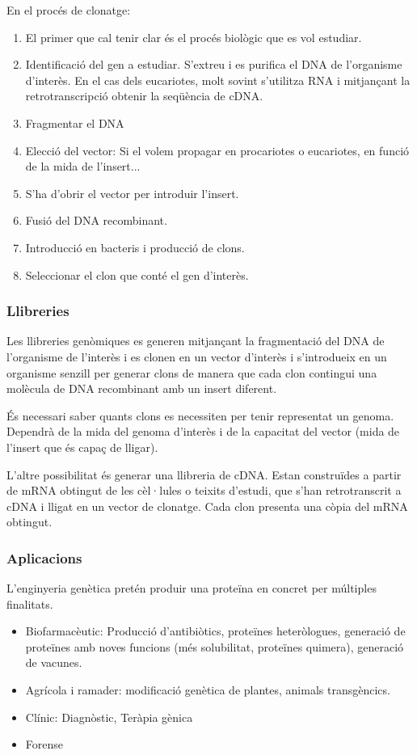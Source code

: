 En el procés de clonatge:
\begin{enumerate}
\item El primer que cal tenir clar és el procés biològic que es vol estudiar.
\item Identificació del gen a estudiar. S'extreu i es purifica el DNA de l'organisme d'interès. En el cas dels eucariotes, molt sovint s'utilitza RNA i mitjançant la retrotranscripció obtenir la seqüència de cDNA.
\item Fragmentar el DNA
\item Elecció del vector: Si el volem propagar en procariotes o eucariotes, en funció de la mida de l'insert...
\item S'ha d'obrir el vector per introduir l'insert.
\item Fusió del DNA recombinant.
\item Introducció en bacteris i producció de clons.
\item Seleccionar el clon que conté el gen d'interès.
\end{enumerate}

\subsubsection{Llibreries}
Les llibreries genòmiques es generen mitjançant la fragmentació del DNA de l'organisme de l'interès i es clonen en un vector d'interès i s'introdueix en un organisme senzill per generar clons de manera que cada clon contingui una molècula de DNA recombinant amb un insert diferent.

És necessari saber quants clons es necessiten per tenir representat un genoma. Dependrà de la mida del genoma d'interès i de la capacitat del vector (mida de l'insert que és capaç de lligar).

L'altre possibilitat és generar una llibreria de cDNA. Estan construïdes a partir de mRNA obtingut de les cèl·lules o teixits d'estudi, que s'han retrotranscrit a cDNA i lligat en un vector de clonatge. Cada clon presenta una còpia del mRNA obtingut.

\subsubsection{Aplicacions}
L'enginyeria genètica pretén produir una proteïna en concret per múltiples finalitats.

\begin{itemize}
\item Biofarmacèutic: Producció d'antibiòtics, proteïnes heteròlogues, generació de proteïnes amb noves funcions (més solubilitat, proteïnes quimera), generació de vacunes.
\item Agrícola i ramader: modificació genètica de plantes, animals transgèncics.
\item Clínic: Diagnòstic, Teràpia gènica
\item Forense
\end{itemize}

